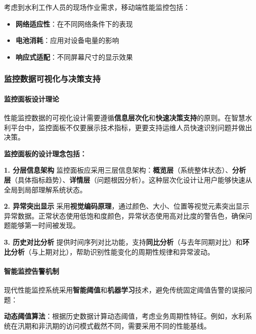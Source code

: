 考虑到水利工作人员的现场作业需求，移动端性能监控包括：

\begin{itemize}
\tightlist
\item
  \textbf{网络适应性}：在不同网络条件下的表现
\item
  \textbf{电池消耗}：应用对设备电量的影响
\item
  \textbf{响应式适配}：不同屏幕尺寸的显示效果
\end{itemize}

\subsubsection{监控数据可视化与决策支持}\label{ux76d1ux63a7ux6570ux636eux53efux89c6ux5316ux4e0eux51b3ux7b56ux652fux6301}

\paragraph{监控面板设计理论}\label{ux76d1ux63a7ux9762ux677fux8bbeux8ba1ux7406ux8bba}

性能监控数据的可视化设计需要遵循\textbf{信息层次化}和\textbf{快速决策支持}的原则。在智慧水利平台中，监控面板不仅要展示技术指标，更要支持运维人员快速识别问题并做出决策。

\textbf{监控面板的设计理念包括：}

\textbf{1. 分层信息架构} 监控面板应采用三层信息架构：\textbf{概览层}（系统整体状态）、\textbf{分析层}（具体指标趋势）、\textbf{详情层}（问题根因分析）。这种层次化设计让用户能够快速从全局到局部理解系统状态。

\textbf{2. 异常突出显示} 采用\textbf{视觉编码原理}，通过颜色、大小、位置等视觉元素突出显示异常数据。正常状态使用低饱和度颜色，异常状态使用高对比度的警告色，确保问题能够第一时间被发现。

\textbf{3. 历史对比分析} 提供时间序列对比功能，支持\textbf{同比分析}（与去年同期对比）和\textbf{环比分析}（与上期对比），帮助识别性能变化的周期性规律和异常波动。

\paragraph{智能监控告警机制}\label{ux667aux80fdux76d1ux63a7ux544aux8b66ux673aux5236}

现代性能监控系统采用\textbf{智能阈值}和\textbf{机器学习}技术，避免传统固定阈值告警的误报问题：

\textbf{动态阈值算法}：根据历史数据计算动态阈值，考虑业务周期性特征。例如，水利系统在汛期和非汛期的访问模式截然不同，需要采用不同的性能基线。

